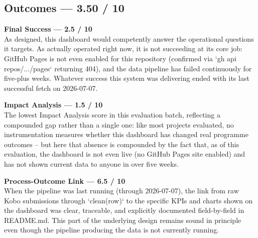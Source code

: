 \documentclass[12pt, a4paper]{article}
\begin{document}
\subsection{Outcomes --- 3.50 / 10}
\begin{mdframed}[style=alertbox]\textbf{Final Success --- 2.5 / 10}\\
As designed, this dashboard would competently answer the operational questions it targets. As actually operated right now, it is not succeeding at its core job: GitHub Pages is not even enabled for this repository (confirmed via `gh api repos/.../pages` returning 404), and the data pipeline has failed continuously for five-plus weeks. Whatever success this system was delivering ended with its last successful fetch on 2026-07-07.\end{mdframed}
\begin{mdframed}[style=alertbox]\textbf{Impact Analysis --- 1.5 / 10}\\
The lowest Impact Analysis score in this evaluation batch, reflecting a compounded gap rather than a single one: like most projects evaluated, no instrumentation measures whether this dashboard has changed real programme outcomes -- but here that absence is compounded by the fact that, as of this evaluation, the dashboard is not even live (no GitHub Pages site enabled) and has not shown current data to anyone in over five weeks.\end{mdframed}
\begin{mdframed}[style=warnbox]\textbf{Process-Outcome Link --- 6.5 / 10}\\
When the pipeline was last running (through 2026-07-07), the link from raw Kobo submissions through `clean(row)` to the specific KPIs and charts shown on the dashboard was clear, traceable, and explicitly documented field-by-field in README.md. This part of the underlying design remains sound in principle even though the pipeline producing the data is not currently running.\end{mdframed}
\end{document}

